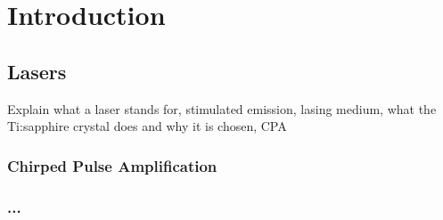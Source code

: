 \chapter{Introduction}

\section{Lasers}

Explain what a laser stands for, stimulated emission, lasing medium, what the Ti:sapphire crystal does and why it is chosen, CPA

\subsection{Chirped Pulse Amplification}

\subsection{...}

%

